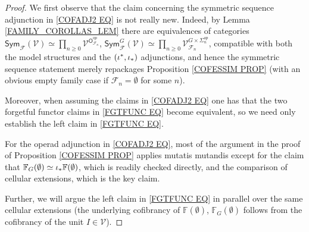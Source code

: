 \documentclass[a4paper,10pt
,draft
]{article}%
\numberwithin{equation}{section}
\numberwithin{figure}{section}
\theoremstyle{definition} %
\newcommand{\1}{\ensuremath{\mathbbm 1}}%
\begin{document}
\begin{proof}
We first observe that the claim concerning the symmetric sequence adjunction in \eqref{COFADJ2 EQ}
is not really new. Indeed, 
by Lemma \ref{FAMILY_COROLLAS_LEM}
there are equivalences of categories
$
\mathsf{Sym}_{\mathcal{F}}(\mathcal{V})
\simeq \prod_{n \geq 0}
\mathcal{V}^{\mathsf{O}^{op}_{\mathcal{F}_n}}
$,
$
\mathsf{Sym}^G_{\mathcal{F}}(\mathcal{V})
\simeq \prod_{n \geq 0}
\mathcal{V}_{\mathcal{F}_n}^{G \times \Sigma_n^{op}}
$,
compatible with both the model structures and the $(\iota^{\**},\iota_{\**})$ adjunctions,
and hence the symmetric sequence statement merely repackages 
Proposition \ref{COFESSIM PROP}
(with an obvious empty family case if 
$\mathcal{F}_n =\emptyset$ for some $n$).


Moreover, when assuming the claims in \eqref{COFADJ2 EQ}
one has that
the two forgetful functor claims in \eqref{FGTFUNC EQ}
become equivalent,
so we need only establish the
left claim in \eqref{FGTFUNC EQ}.


For the operad adjunction in \eqref{COFADJ2 EQ},
most of the argument in the proof of
Proposition \ref{COFESSIM PROP}
applies mutatis mutandis
except for the claim that 
$\mathbb{F}_{G} (\emptyset) \simeq \iota_{\**} \mathbb{F} (\emptyset)$, 
which is readily checked directly, 
and the comparison of cellular extensions,
which is the key claim.


Further, we will argue the left claim in \eqref{FGTFUNC EQ} in parallel over the same cellular extensions
(the underlying cofibrancy of
$\mathbb{F}(\emptyset)$, 
$\mathbb{F}_G(\emptyset)$
follows from the cofibrancy of the unit 
$I \in \mathcal{V}$).
 

\end{proof}
\end{document}
